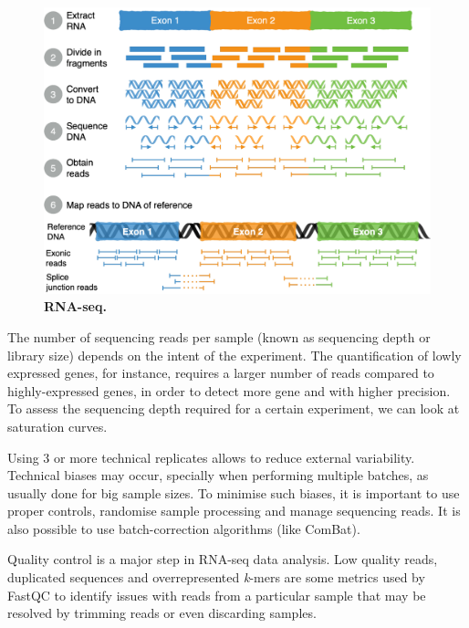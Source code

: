 \begin{figure}[!h]
  \centering
  \includegraphics[width=1\linewidth]{images/intro/rna-seq}
  \caption[RNA-seq]{\textbf{RNA-seq.}}
\end{figure}

The number of sequencing reads per sample (known as sequencing depth or library size) depends on the intent of the experiment. The quantification of lowly expressed genes, for instance, requires a larger number of reads compared to highly-expressed genes, in order to detect more gene and with higher precision. To assess the sequencing depth required for a certain experiment, we can look at saturation curves.

Using 3 or more technical replicates allows to reduce external variability. Technical biases may occur, specially when performing multiple batches, as usually done for big sample sizes. To minimise such biases, it is important to use proper controls, randomise sample processing and manage sequencing reads. It is also possible to use batch-correction algorithms (like ComBat).

Quality control is a major step in RNA-seq data analysis. Low quality reads, duplicated sequences and overrepresented \emph{k}-mers are some metrics used by FastQC to identify issues with reads from a particular sample that may be resolved by trimming reads or even discarding samples. %

